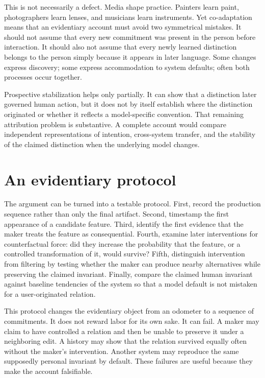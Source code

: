 \documentclass[11pt]{article}
\begin{document}
This is not necessarily a defect. Media shape practice. Painters learn paint, photographers learn lenses, and musicians learn instruments. Yet co-adaptation means that an evidentiary account must avoid two symmetrical mistakes. It should not assume that every new commitment was present in the person before interaction. It should also not assume that every newly learned distinction belongs to the person simply because it appears in later language. Some changes express discovery; some express accommodation to system defaults; often both processes occur together.

Prospective stabilization helps only partially. It can show that a distinction later governed human action, but it does not by itself establish where the distinction originated or whether it reflects a model-specific convention. That remaining attribution problem is substantive. A complete account would compare independent representations of intention, cross-system transfer, and the stability of the claimed distinction when the underlying model changes.

\section{An evidentiary protocol}
The argument can be turned into a testable protocol. First, record the production sequence rather than only the final artifact. Second, timestamp the first appearance of a candidate feature. Third, identify the first evidence that the maker treats the feature as consequential. Fourth, examine later interventions for counterfactual force: did they increase the probability that the feature, or a controlled transformation of it, would survive? Fifth, distinguish intervention from filtering by testing whether the maker can produce nearby alternatives while preserving the claimed invariant. Finally, compare the claimed human invariant against baseline tendencies of the system so that a model default is not mistaken for a user-originated relation.

This protocol changes the evidentiary object from an odometer to a sequence of commitments. It does not reward labor for its own sake. It can fail. A maker may claim to have controlled a relation and then be unable to preserve it under a neighboring edit. A history may show that the relation survived equally often without the maker's intervention. Another system may reproduce the same supposedly personal invariant by default. These failures are useful because they make the account falsifiable.
\end{document}
